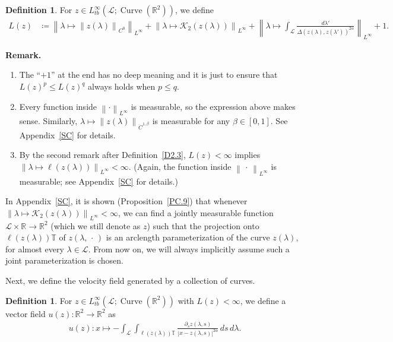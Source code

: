\documentclass[reqno,centertags,12pt]{amsart}
\theoremstyle{definition}
\newtheorem{definition}[theorem]{Definition}
\numberwithin{equation}{section}
\newcommand{\abs}[1]{\left\lvert#1\right\rvert}
\newcommand{\norm}[1]{\left\|#1\right\|}
\newcommand{\bbR}{{\mathbb{R}}}
\newcommand{\bbT}{{\mathbb{T}}}
\begin{document}
\begin{definition}\label{D2.4}
    For $z\in L_{tb}^{\infty}(\mathcal{L};\operatorname{Curve}(\bbR^{2}))$, we define
    \begin{align*}
        L(z) &\coloneqq \norm{
            \lambda\mapsto \norm{z(\lambda)}_{C^{0}}
        }_{L^{\infty}}
        + \norm{
            \lambda\mapsto \mathcal{K}_{2}(z(\lambda))
        }_{L^{\infty}}
        + \norm{\lambda\mapsto \int_{\mathcal{L}}\frac{d\lambda'}
        {\Delta(z(\lambda),z(\lambda'))^{2\alpha}}}_{L^{\infty}} + 1.
    \end{align*}
\end{definition}

\textbf{Remark.} \begin{enumerate}
    \item The ``$+1$'' at the end has no deep meaning and it
    is just to ensure that $L(z)^{p} \leq L(z)^{q}$ always holds when $p\leq q$.

    \item Every function inside $\norm{\cdot}_{L^{\infty}}$ is measurable,
    so the expression above makes sense.
    Similarly, $\lambda\mapsto \norm{z(\lambda)}_{\dot{C}^{1,\beta}}$ is
    measurable for any $\beta\in[0,1]$.
    See Appendix~\ref{SC} for details.

    \item By the second remark after Definition~\ref{D2.3},
    $L(z)<\infty$ implies $\norm{\lambda\mapsto\ell(z(\lambda))}_{L^{\infty}}<\infty$.
    (Again, the function inside $\norm{\,\cdot\,}_{L^{\infty}}$ is measurable;
    see Appendix~\ref{SC} for details.)
\end{enumerate}

In Appendix~\ref{SC}, it is shown
(Proposition~\ref{PC.9}) that whenever
$\norm{\lambda\mapsto \mathcal{K}_{2}(z(\lambda))}_{L^{\infty}} < \infty$,
we can find a jointly measurable function $\mathcal{L}\times\bbR\to\bbR^{2}$
(which we still denote as $z$) such that the projection onto $\ell(z(\lambda))\bbT$ of
$z(\lambda,\,\cdot\,)$ is an arclength parameterization of the curve $z(\lambda)$,
for almost every $\lambda\in\mathcal{L}$. From now on, we will always implicitly
assume such a joint parameterization is chosen.

Next, we define the velocity field generated by a collection of curves.

\begin{definition}\label{D2.5}
    For $z\in L_{tb}^{\infty}(\mathcal{L};\operatorname{Curve}(\bbR^{2}))$ with
    $L(z) < \infty$, we define a vector field $u(z)\colon \bbR^{2} \to \bbR^{2}$ as
    \begin{align*}
        u(z)\colon x\mapsto
        -\int_{\mathcal{L}}\int_{\ell(z(\lambda))\bbT}
        \frac{\partial_{s}z(\lambda,s)}
        {\abs{x - z(\lambda,s)}^{2\alpha}} \,ds\,d\lambda.
    \end{align*}
\end{definition}
\end{document}
